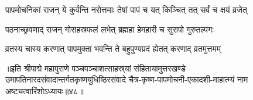 \twolineshloka
{पापमोचनिकां राजन् ये कुर्वन्ति नरोत्तमाः}
{तेषां पापं च यत् किञ्चित् तत् सर्वं च क्षयं व्रजेत्}%

\twolineshloka
{पठनाच्छ्रवणाद् राजन् गोसहस्रफलं लभेत्}
{ब्रह्महा हेमहारी च सुरापो गुरुतल्पगः}%

\twolineshloka
{व्रतस्य चास्य करणात् पापमुक्ता भवन्ति ते}
{बहुपुण्यप्रदं ह्येतत् करणाद् व्रतमुत्तमम्}%

॥इति श्रीपाद्मे महापुराणे पञ्चपञ्चाशत्साहस्र्यां संहितायामुत्तरखण्डे उमापतिनारदसंवादान्तर्गतकृष्णयुधिष्ठिरसंवादे चैत्र-कृष्ण-पापमोचनी-एकादशी-माहात्म्यं नाम अष्टचत्वारिंशोऽध्यायः॥४८॥

\genMangalaShloka

\hyperref[sec:ekadashi_mahatmyam_padma_puranam]{\closesub}
\clearpage

